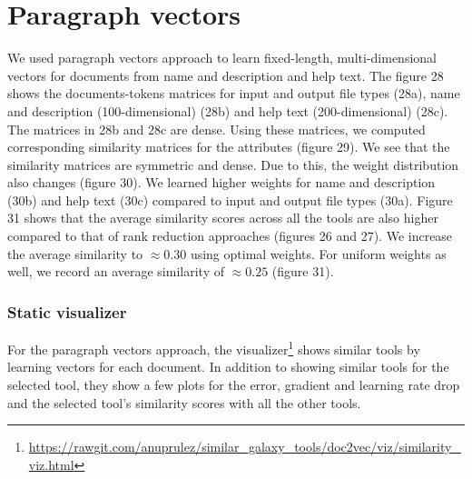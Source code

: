 \section{Paragraph vectors}
We used paragraph vectors approach to learn fixed-length, multi-dimensional vectors for documents from name and description and help text. The figure 28 shows the documents-tokens matrices for input and output file types (28a), name and description (100-dimensional) (28b) and help text (200-dimensional) (28c). The matrices in 28b and 28c are dense. Using these matrices, we computed corresponding similarity matrices for the attributes (figure 29). We see that the similarity matrices are symmetric and dense. Due to this, the weight distribution also changes (figure 30). We learned higher weights for name and description (30b) and help text (30c) compared to input and output file types (30a). Figure 31 shows that the average similarity scores across all the tools are also higher compared to that of rank reduction approaches (figures 26 and 27). We increase the average similarity to $\approx0.30$ using optimal weights. For uniform weights as well, we record an average similarity of $\approx0.25$ (figure 31).

\subsubsection{Static visualizer}
For the paragraph vectors approach, the visualizer\footnote{\url{https://rawgit.com/anuprulez/similar_galaxy_tools/doc2vec/viz/similarity_viz.html}} shows similar tools by learning vectors for each document. In addition to showing similar tools for the selected tool, they show a few plots for the error, gradient and learning rate drop and the selected tool's similarity scores with all the other tools. 

